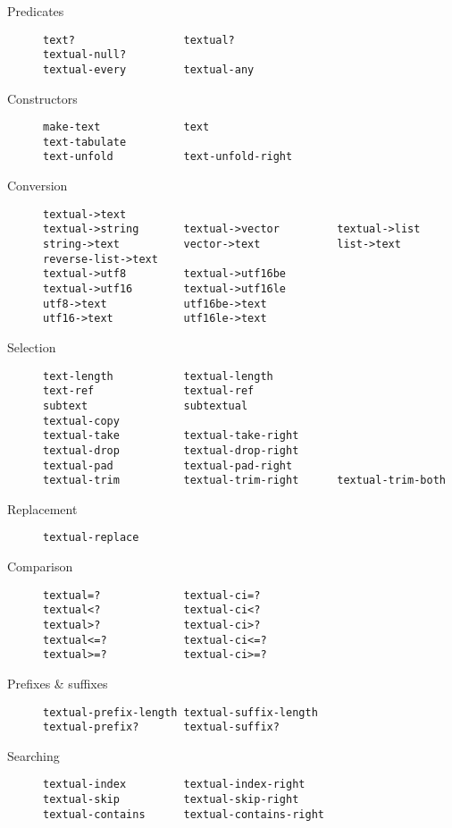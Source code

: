 \begin{description}
\item[ Predicates]
\begin{verbatim}
text?                 textual?
textual-null? 
textual-every         textual-any
\end{verbatim}
\item[ Constructors]
\begin{verbatim}
make-text             text
text-tabulate
text-unfold           text-unfold-right
\end{verbatim}
\item[ Conversion]
\begin{verbatim}
textual->text
textual->string       textual->vector         textual->list
string->text          vector->text            list->text
reverse-list->text
textual->utf8         textual->utf16be
textual->utf16        textual->utf16le
utf8->text            utf16be->text
utf16->text           utf16le->text
\end{verbatim}
\item[ Selection]
\begin{verbatim}
text-length           textual-length
text-ref              textual-ref
subtext               subtextual
textual-copy
textual-take          textual-take-right
textual-drop          textual-drop-right
textual-pad           textual-pad-right 
textual-trim          textual-trim-right      textual-trim-both
\end{verbatim}
\item[ Replacement]
\begin{verbatim}
textual-replace
\end{verbatim}
\item[ Comparison]
\begin{verbatim}
textual=?             textual-ci=?
textual<?             textual-ci<?
textual>?             textual-ci>?
textual<=?            textual-ci<=?
textual>=?            textual-ci>=?
\end{verbatim}
\item[Prefixes \& suffixes]
\begin{verbatim}
textual-prefix-length textual-suffix-length
textual-prefix?       textual-suffix?    
\end{verbatim}
\item[Searching]
\begin{verbatim}
textual-index         textual-index-right
textual-skip          textual-skip-right
textual-contains      textual-contains-right
\end{verbatim}

\end{description}
